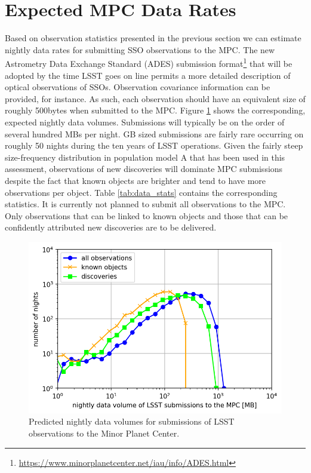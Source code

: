 \section{Expected \gls{MPC} Data Rates}\label{sec:data}
Based on observation statistics presented in the previous section we can estimate nightly data rates for submitting \gls{SSO} observations to the \gls{MPC}. The new Astrometry Data Exchange Standard (\gls{ADES}) submission format\footnote{\url{https://www.minorplanetcenter.net/iau/info/ADES.html}} that will be adopted by the time \gls{LSST} goes on line permits a more detailed description of optical observations of SSOs. Observation covariance information can be provided, for instance. As such, each observation should have an equivalent size of roughly 500bytes when submitted to the \gls{MPC}. Figure \ref{fig:data} shows the corresponding, expected nightly data volumes. Submissions will typically be on the order of several hundred MBs per night. \gls{GB} sized submissions are fairly rare occurring on roughly 50 nights during the ten years of \gls{LSST} operations. Given the fairly steep size-frequency distribution in population model A that has been used in this assessment, observations of new discoveries will dominate \gls{MPC} submissions despite the fact that known objects are brighter and tend to have more observations per object. Table \ref{tab:data_stats} contains the corresponding statistics. It is currently not planned to submit all observations to the \gls{MPC}. Only observations
that can be linked to known objects and those that can be confidently attributed new discoveries are to be delivered. 


\begin{figure}[tb!]
\begin{center}
\includegraphics[width=0.70\linewidth]{figs/data2.png}
\end{center}
\caption{Predicted nightly data volumes for submissions of \gls{LSST} observations to the Minor Planet \gls{Center}.}
\label{fig:data}       %
\end{figure}
\clearpage

